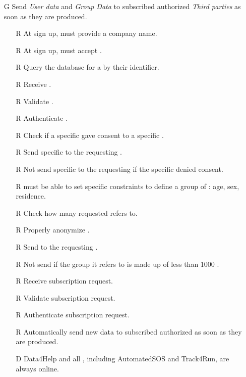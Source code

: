 \documentclass[../../../rasd.tex]{subfiles}
\begin{document}
\begin{itemize}
    \item[G\subs{4}]Send \textit{User data} and \textit{Group Data} to subscribed authorized \textit{Third parties} as soon as they are produced.
    \begin{itemize}
            \item[R\subs{3}]At sign up,  must provide a company name.
            \item[R\subs{5}]At sign up,  must accept .
        \item[R\subs{7}]Query the database for a  by their identifier.
        \item[R\subs{8}]Receive .
        \item[R\subs{9}]Validate .
        \item[R\subs{10}]Authenticate .
        \item[R\subs{18}]Check if a specific  gave consent to a specific .
        \item[R\subs{19}]Send specific to the requesting .
        \item[R\subs{20}]Not send specific to the requesting  if the specific  denied consent.
        \item[R\subs{21}] must be able to set specific constraints to define a group of : age, sex, residence.
        \item[R\subs{22}]Check how many  requested  refers to.
        \item[R\subs{23}]Properly anonymize .
        \item[R\subs{24}]Send  to the requesting .
        \item[R\subs{25}]Not send  if the group it refers to is made up of less than 1000 .
        \item[R\subs{26}]Receive  subscription request.
        \item[R\subs{27}]Validate  subscription request.
        \item[R\subs{28}]Authenticate  subscription request.
        \item[R\subs{29}]Automatically send new data to subscribed authorized  as soon as they are produced.
        \\
        \item[D\subs{9}]Data4Help and all , including AutomatedSOS and Track4Run, are always online.

\end{itemize}
\end{itemize}
\end{document}
